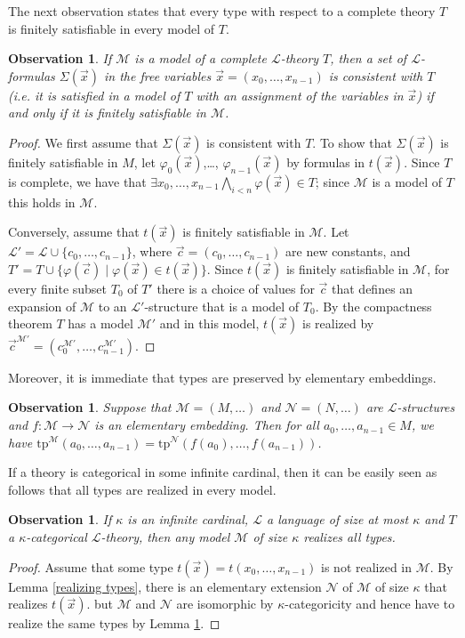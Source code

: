 \documentclass[10pt]{amsart}
\renewcommand{\L}{\mathcal{L}}
\newcommand{\MM}{\mathcal{M}}
\newcommand{\NN}{\mathcal{N}}
\newcommand{\tp}{\mathrm{tp}}
\newtheorem{observation}[theorem]{Observation}
\theoremstyle{definition}
\theoremstyle{remark}
\begin{document}
The next observation states that every type with respect to a complete theory $T$ is finitely satisfiable in every model of $T$. 

\begin{observation} 
If $\MM$ is a model of a complete $\L$-theory $T$, then a set of $\L$-formulas $\Sigma(\vec{x})$ in the free variables $\vec{x}=(x_0,\dots,x_{n-1})$ is consistent with $T$ (i.e. it is satisfied in a model of $T$ with an assignment of the variables in $\vec{x}$) if and only if it is finitely satisfiable in $\MM$. 
\end{observation}  
\begin{proof} 
We first assume that $\Sigma(\vec{x})$ is consistent with $T$. To show that $\Sigma(\vec{x})$ is finitely satisfiable in $M$, let $\varphi_0(\vec{x})$,\dots, $\varphi_{n-1}(\vec{x})$ by formulas in $t(\vec{x})$. Since $T$ is complete, we have that $\exists x_0,\dots,x_{n-1} \bigwedge_{i<n}\varphi(\vec{x})\in T$; since $\MM$ is a model of $T$ this holds in $\MM$. 

Conversely, assume that $t(\vec{x})$ is finitely satisfiable in $\MM$. Let $\L'=\L\cup\{c_0,\dots,c_{n-1}\}$, where $\vec{c}=(c_0,\dots,c_{n-1})$ are new constants, and $T'=T\cup\{\varphi(\vec{c})\mid \varphi(\vec{x})\in t(\vec{x})\}$. Since $t(\vec{x})$ is finitely satisfiable in $\MM$, for every finite subset $T_0$ of $T'$ there is a choice of values for $\vec{c}$ that defines an expansion of $\MM$ to an $\L'$-structure that is a model of $T_0$. By the compactness theorem $T$ has a model $\MM'$ and in this model, $t(\vec{x})$ is realized by $\vec{c}^{\MM'}=(c_0^{\MM'},\dots,c_{n-1}^{\MM'})$. 
\end{proof} 

Moreover, it is immediate that types are preserved by elementary embeddings. 

\begin{observation} \label{elementary embeddings preserve types} 
Suppose that $\MM=(M,\dots)$ and $\NN=(N,\dots)$ are $\L$-structures and $f\colon \MM\rightarrow \NN$ is an elementary embedding. Then for all $a_0,\dots,a_{n-1}\in M$, we have $\tp^\MM(a_0,\dots,a_{n-1})=\tp^\NN(f(a_0),\dots,f(a_{n-1}))$. 
\end{observation}

If a theory is categorical in some infinite cardinal, then it can be easily seen as follows that all types are realized in every model. 

\begin{observation} 
If $\kappa$ is an infinite cardinal, $\L$ a language of size at most $\kappa$ and $T$ a $\kappa$-categorical $\L$-theory, then any model $\MM$ of size $\kappa$ realizes all types. 
\end{observation} 
\begin{proof} 
Assume that some type $t(\vec{x})=t(x_0,\dots,x_{n-1})$ is not realized in $\MM$. By Lemma \ref{realizing types}, there is an elementary extension $\NN$ of $\MM$ of size $\kappa$ that realizes $t(\vec{x})$. but $\MM$ and $\NN$ are isomorphic by $\kappa$-categoricity and hence have to realize the same types by Lemma \ref{elementary embeddings preserve types}. 
\end{proof} 
\end{document}
